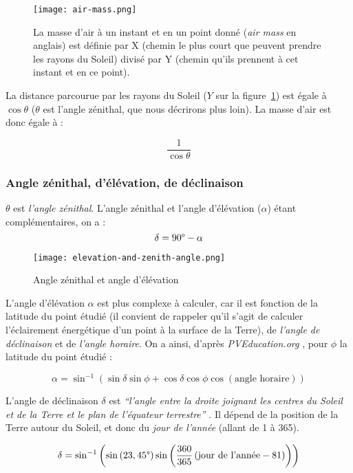 \documentclass[12pt]{article}
\begin{document}
\begin{figure}[!ht]
	\centerline{\texttt{[image: air-mass.png]}}
	\caption{La masse d'air à un instant et en un point donné (\textit{air mass} en anglais) est définie par X (chemin le plus court que peuvent prendre les rayons du Soleil) divisé par Y (chemin qu'ils prennent à cet instant et en ce point).}
	\label{fig:air-mass}
\end{figure}

La distance parcourue par les rayons du Soleil ($Y$ sur la figure~\ref{fig:air-mass}) est égale à $\cos \theta$ ($\theta$ est l'angle zénithal, que nous décrirons plus loin).
La masse d'air est donc égale à :

\[\frac{1 }{\cos \theta}\]


\subsubsection{Angle zénithal, d'élévation, de déclinaison}
$\theta$ est \emph{l'angle zénithal}. L'angle zénithal et l'angle d'élévation ($\alpha$) étant complémentaires, on a :
\[
	\delta = 90\degree - \alpha
\]

\begin{figure}[!ht]
	\centerline{\texttt{[image: elevation-and-zenith-angle.png]}}
	\caption{Angle zénithal et angle d'élévation}
	\label{fig:elevation-and-zenith-angle}
\end{figure}

L'angle d'élévation $\alpha$ est plus complexe à calculer, car il est fonction de la latitude du point étudié (il convient de rappeler qu'il s'agit de calculer l'éclairement énergétique d'un point à la surface de la Terre), de \emph{l'angle de déclinaison} et de \emph{l'angle horaire}. On a ainsi, d'après \emph{PVEducation.org} \cite{pos_elevation_angle}, pour $\phi$ la latitude du point étudié :

\[
	\alpha = \sin^{-1} \left(
		\sin \delta \sin \phi +
		\cos \delta \cos \phi \cos \left( \text{angle horaire} \right)
	\right)
\]

L'angle de déclinaison $\delta$ est \emph{``l'angle entre la droite joignant les centres du Soleil et de la Terre et le plan de l'équateur terrestre''} \cite{mouvement_terre}. Il dépend de la position de la Terre autour du Soleil, et donc du \emph{jour de l'année} (allant de 1 à 365).


\[
	\delta = \sin^{-1} \left(
		\sin \left( 23,45\degree \right)
		\sin \left(
			\frac{360}{365}
			\left(
				\text{jour de l'année} - 81
			\right)
		\right)
	\right)
\]
\end{document}
